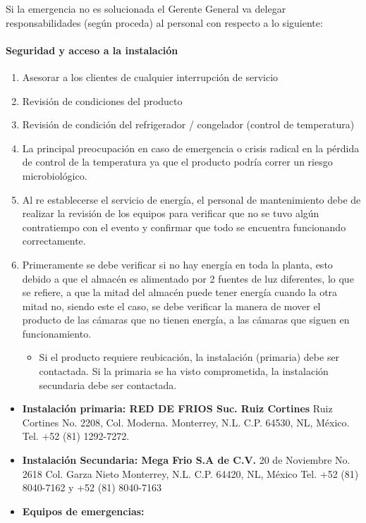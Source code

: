 Si la emergencia no es solucionada el Gerente General va delegar responsabilidades (según proceda) al personal con respecto a lo siguiente:

\paragraph{Seguridad y acceso a la instalación}

\begin{enumerate}
	\item Asesorar a los clientes de cualquier interrupción de servicio
	\item Revisión de condiciones del producto
	\item Revisión de condición del refrigerador / congelador (control de temperatura)
	\item La principal preocupación en caso de emergencia o crisis radical en la pérdida de control de la temperatura ya que el producto podría correr un riesgo microbiológico.
	\item Al re establecerse el servicio de energía, el personal de mantenimiento debe de realizar la revisión de los equipos para verificar que no se tuvo algún contratiempo con el evento y confirmar que todo se encuentra funcionando correctamente.
	\item Primeramente se debe verificar si no hay energía en toda la planta, esto debido a que el almacén es alimentado por 2 fuentes de luz diferentes, lo que se refiere, a que la mitad del almacén puede tener energía cuando la otra mitad no, siendo este el caso, se debe verificar la manera de mover el producto de las cámaras que no tienen energía, a las cámaras que siguen en funcionamiento.
	\begin{itemize}
		\item Si el producto requiere reubicación, la instalación (primaria) debe ser contactada. Si la primaria se ha visto comprometida, la instalación secundaria debe ser contactada.
	\end{itemize}
\end{enumerate}

\begin{itemize}
	\item \textbf{Instalación primaria: RED DE FRIOS Suc. Ruiz Cortines}
Ruiz Cortines No. 2208, Col. Moderna. Monterrey, N.L. C.P. 64530, NL, México.
Tel. +52 (81) 1292-7272.
	\item \textbf{Instalación Secundaria: Mega Frio S.A de C.V.}
20 de Noviembre No. 2618 Col. Garza Nieto Monterrey, N.L. C.P. 64420, NL, México
Tel. +52 (81) 8040-7162 y +52 (81) 8040-7163
	\item \textbf{Equipos de emergencias:}
\end{itemize}


